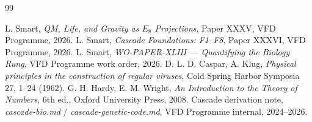 \documentclass[12pt]{article}
\theoremstyle{definition}
\theoremstyle{remark}
\begin{document}

\begin{thebibliography}{99}

 L. Smart, \emph{QM, Life, and Gravity as $E_8$ Projections}, Paper XXXV, VFD Programme, 2026.
 L. Smart, \emph{Cascade Foundations: F1--F8}, Paper XXXVI, VFD Programme, 2026.
 L. Smart, \emph{WO-PAPER-XLIII --- Quantifying the Biology Rung}, VFD Programme work order, 2026.
 D. L. D. Caspar, A. Klug, \emph{Physical principles in the construction of regular viruses}, Cold Spring Harbor Symposia 27, 1--24 (1962).
 G. H. Hardy, E. M. Wright, \emph{An Introduction to the Theory of Numbers}, 6th ed., Oxford University Press, 2008.
 Cascade derivation note, \emph{cascade-bio.md} / \emph{cascade-genetic-code.md}, VFD Programme internal, 2024--2026.

\end{thebibliography}
\end{document}
